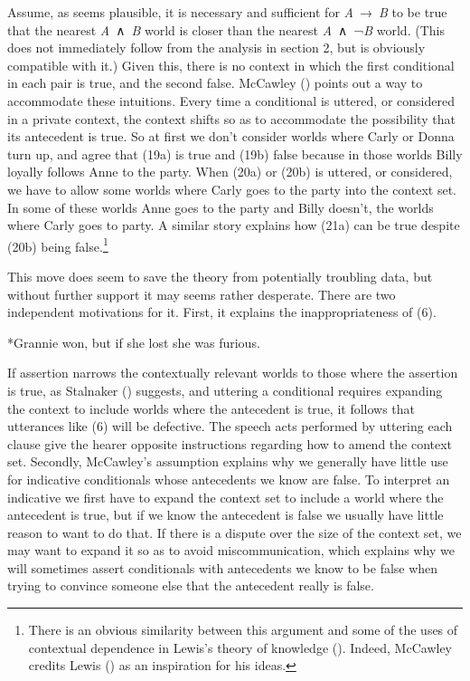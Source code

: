 \documentclass[
  10pt,
  letterpaper,
  DIV=11,
  numbers=noendperiod,
  twoside]{scrartcl}
\providecommand{\tightlist}{%
  \setlength{\itemsep}{0pt}\setlength{\parskip}{0pt}}\usepackage{longtable,booktabs,array}
\begin{document}
Assume, as seems plausible, it is necessary and sufficient for
\emph{A}~→~\emph{B} to be true that the nearest \emph{A}~∧~\emph{B}
world is closer than the nearest \emph{A}~∧~¬\emph{B} world. (This does
not immediately follow from the analysis in section 2, but is obviously
compatible with it.) Given this, there is no context in which the first
conditional in each pair is true, and the second false. McCawley
() points out a way to accommodate
these intuitions. Every time a conditional is uttered, or considered in
a private context, the context shifts so as to accommodate the
possibility that its antecedent is true. So at first we don't consider
worlds where Carly or Donna turn up, and agree that (19a) is true and
(19b) false because in those worlds Billy loyally follows Anne to the
party. When (20a) or (20b) is uttered, or considered, we have to allow
some worlds where Carly goes to the party into the context set. In some
of these worlds Anne goes to the party and Billy doesn't, the worlds
where Carly goes to party. A similar story explains how (21a) can be
true despite (20b) being false.\footnote{There is an obvious similarity
  between this argument and some of the uses of contextual dependence in
  Lewis's theory of knowledge ().
  Indeed, McCawley credits Lewis () as
  an inspiration for his ideas.}

This move does seem to save the theory from potentially troubling data,
but without further support it may seems rather desperate. There are two
independent motivations for it. First, it explains the inappropriateness
of (6).

\begin{description}
\tightlist
\item[(6)]
*Grannie won, but if she lost she was furious.
\end{description}

If assertion narrows the contextually relevant worlds to those where the
assertion is true, as Stalnaker ()
suggests, and uttering a conditional requires expanding the context to
include worlds where the antecedent is true, it follows that utterances
like (6) will be defective. The speech acts performed by uttering each
clause give the hearer opposite instructions regarding how to amend the
context set. Secondly, McCawley's assumption explains why we generally
have little use for indicative conditionals whose antecedents we know
are false. To interpret an indicative we first have to expand the
context set to include a world where the antecedent is true, but if we
know the antecedent is false we usually have little reason to want to do
that. If there is a dispute over the size of the context set, we may
want to expand it so as to avoid miscommunication, which explains why we
will sometimes assert conditionals with antecedents we know to be false
when trying to convince someone else that the antecedent really is
false.
\end{document}
